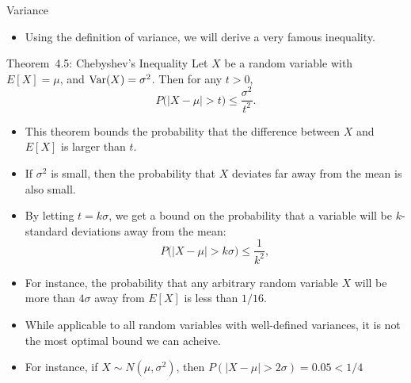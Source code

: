 \begin{frame}[allowframebreaks]{Variance}
  \framebreak
  
  \begin{itemize}
    \item Using the definition of variance, we will derive a very famous inequality.
  \end{itemize}
  
  \begin{block}{Theorem~4.5: Chebyshev's Inequality}
    Let $X$ be a random variable with $E[X] = \mu$, and $\mathrm{Var}(X) = \sigma^2$. Then for any $t > 0$,
    $$
    P\big(|X - \mu| > t\big) \leq \frac{\sigma^2}{t^2}.
    $$
  \end{block}
  
  \begin{itemize}
    \item This theorem bounds the probability that the difference between $X$ and $E[X]$ is larger than $t$.
    \item If $\sigma^2$ is small, then the probability that $X$ deviates far away from the mean is also small.
    \item By letting $t = k\sigma$, we get a bound on the probability that a variable will be $k$-standard deviations away from the mean:
    $$
    P\big(|X - \mu| > k\sigma\big)\leq \frac{1}{k^2},
    $$
    \item For instance, the probability that any arbitrary random variable $X$ will be more than $4\sigma$ away from $E[X]$ is less than $1/16$.
    \item While applicable to all random variables with well-defined variances, it is not the most optimal bound we can acheive.
    \item For instance, if $X \sim N(\mu, \sigma^2)$, then $P(|X - \mu| > 2\sigma) = 0.05 < 1/4$
  \end{itemize}
  

\end{frame}
